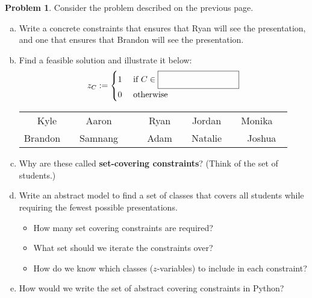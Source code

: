 \documentclass[11pt]{article}
\theoremstyle{definition}
\newtheorem{problem}{Problem}
\newcommand{\answerbox}[3]{%
  \fbox{%
    \begin{minipage}[#1]{#2}
      \hfill\vspace{#3}
    \end{minipage}
  }
}
\newcommand{\wordbox}{\answerbox{c}{1.2in}{.5cm}}
\begin{document}
\begin{problem}  Consider the problem described on the previous page.
\begin{enumerate}[a.]

\item Write a concrete constraints that ensures that Ryan will see the presentation, and one that ensures that Brandon will see the presentation.

\vfill
\item Find a feasible solution and illustrate it below:
\[
z_{C} :=
\begin{cases}
1 & \text{ if } C \in \wordbox \\
0 & \text{ otherwise } 
\end{cases}
\]

\begin{tcolorbox}
\begin{center}
\def\arraystretch{1.5}
\setlength{\tabcolsep}{12pt}
\begin{tabular}{ccccc}
Kyle & Aaron~~ & Ryan & Jordan~~ & Monika~~ \\ Brandon~~ & Samnang~~ & ~~Adam~~ & Natalie~~ & Joshua 
\end{tabular}
\end{center}
\end{tcolorbox}

\bigskip
\item Why are these called {\bf set-covering constraints}? (Think of the set of students.)
\vfill
\item Write an abstract model to find a set of classes that covers all students while requiring the fewest possible presentations. 
\vfill
\newpage
\begin{itemize}
\item How many set covering constraints are required?  
\vfill
\item What set should we iterate the constraints over?  
\vfill
\item How do we know which classes ($z$-variables) to include in each constraint?
\end{itemize}

\vfill
\item How would we write the set of abstract covering constraints in Python?
\vfill
\end{enumerate}
\end{problem}


\newpage
\end{document}
